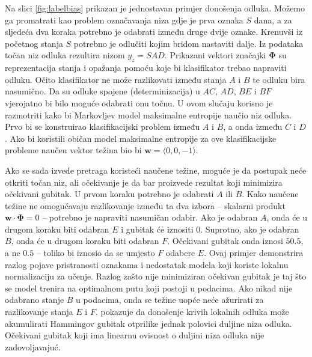 Na slici \ref{fig:labelbias} prikazan je jednostavan primjer donošenja odluka.
Možemo ga promatrati kao problem označavanja niza gdje je prva oznaka $S$ dana,
a za sljedeća dva koraka potrebno je odabrati između druge dvije oznake.
Krenuvši iz početnog stanja $S$ potrebno je odlučiti kojim bridom nastaviti
dalje. Iz podataka točan niz odluka rezultira nizom $y_z = SAD$. Prikazani
vektori značajki $\mathbf{\Phi}$ su reprezentacija stanja i opažanja pomoću koje
bi klasifikator trebao napraviti odluku. Očito klasifikator ne može razlikovati
između stanja $A$ i $B$ te odluku bira nasumično. Da su odluke spojene
(determinizacija) u $AC$, $AD$, $BE$ i $BF$ vjerojatno bi bilo moguće odabrati
onu točnu. U ovom slučaju korisno je razmotriti kako bi Markovljev model
maksimalne entropije naučio niz odluka. Prvo bi se konstruirao klasifikacijski
problem između $A$ i $B$, a onda između $C$ i $D$. Ako bi koristili običan model
maksimalne entropije za ove klasifikacijske probleme naučen vektor težina bio bi
$\mathbf{w} = \langle 0,0,-1 \rangle$.

Ako se sada izvede pretraga koristeći naučene težine, moguće je da postupak neće
otkriti točan niz, ali očekivanje je da bar proizvede rezultat koji minimizira
očekivani gubitak. U prvom koraku potrebno je odabrati $A$ ili $B$. Kako naučene
težine ne omogućavaju razlikovanje između ta dva izbora -- skalarni produkt
$\mathbf{w} \cdot \mathbf{\Phi} = 0$ -- potrebno je napraviti nasumičan odabir.
Ako je odabran $A$, onda će u drugom koraku biti odabran $E$ i gubitak će
iznositi 0. Suprotno, ako je odabran $B$, onda će u drugom koraku biti odabran
$F$. Očekivani gubitak onda iznosi $50.5$, a ne $0.5$ -- toliko bi iznosio da se
umjesto $F$ odabere $E$. Ovaj primjer demonstrira razlog pojave pristranosti
oznakama i nedostatak modela koji koriste lokalnu normalizaciju za učenje.
Razlog zašto nije minimiziran očekivan gubitak je taj što se model trenira na
optimalnom putu koji postoji u podacima. Ako nikad nije odabrano stanje $B$ u
podacima, onda se težine uopće neće ažurirati za razlikovanje stanja $E$ i $F$.
\citet{kaariainen2006lower} pokazuje da donošenje krivih lokalnih odluka može
akumulirati Hammingov gubitak otprilike jednak polovici duljine niza odluka.
Očekivani gubitak koji ima linearnu ovisnost o duljini niza odluka nije
zadovoljavajuć.


